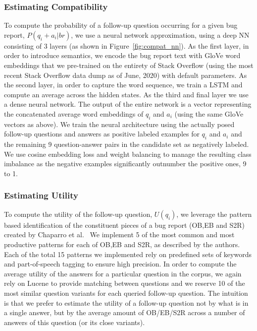 \subsubsection{Estimating Compatibility}
To compute the probability of a follow-up question occurring for a given bug report, $P(q_{i}+a_{i}|br)$, we use a neural
network approximation, using a deep NN consisting of 3 layers (as shown in Figure~\ref{fig:compat_nn}). As the first layer,
in order to introduce semantics, we encode the bug report text with GloVe word embeddings that we pre-trained on the entirety of Stack Overflow (using the most recent Stack Overflow data dump as of June, 2020) with default parameters. As the second layer, in order to capture the word sequence, we train a LSTM and compute an average across the hidden states. As the third and final layer we use a dense neural network. The output of the entire network is a vector representing the concatenated average word embeddings of $q_{i}$ and $a_{i}$ (using the same GloVe vectors as above). We train the neural architecture using the actually posed follow-up questions and answers as positive labeled examples for $q_{i}$ and $a_{i}$ and the remaining 9 question-answer pairs in the candidate set as negatively labeled. We use cosine embedding loss and weight balancing to manage the resulting class imbalance as the negative examples significantly outnumber the positive ones, 9 to 1.

\subsubsection{Estimating Utility}
To compute the utility of the follow-up question, $U(q_{i})$, we leverage the pattern based
identification of the constituent pieces of a bug report (OB,EB and S2R) created by Chaparro et al.~\cite{chaparro17detecting}
We implement 5 of the most common and most productive patterns for each of OB,EB and S2R, as described by
the authors. Each of the total 15 patterns we implemented rely on predefined sets of keywords and part-of-speech tagging to ensure high
precision. In order to compute the average utility of the answers for a particular question in the corpus, we again rely on Lucene to provide
matching between questions and we reserve 10 of the most similar question variants for each queried follow-up question. The intuition is that we prefer to estimate the utility of a follow-up question not by what is in a single answer, but by the average amount of OB/EB/S2R across a number of answers of this question (or its close variants).


%
%
%
